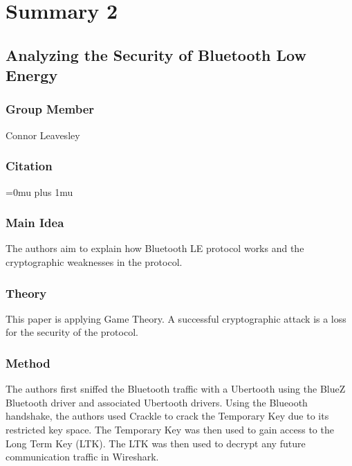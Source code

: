 \section{Summary 2}

\noindent
\subsection{{A}nalyzing the {S}ecurity of {B}luetooth {L}ow {E}nergy}

\subsubsection{Group Member}

\noindent
Connor Leavesley

\noindent
\subsubsection{Citation}

\Urlmuskip=0mu plus 1mu\relax



\subsubsection{Main Idea}

\noindent
The authors aim to explain how Bluetooth LE protocol works and the cryptographic weaknesses in the protocol.


\subsubsection{Theory}

\noindent
This paper is applying Game Theory. A successful cryptographic attack is a loss for the security of the protocol. 

\subsubsection{Method}

\noindent
The authors first sniffed the Bluetooth traffic with a Ubertooth using the BlueZ Bluetooth driver and associated Ubertooth drivers. Using the Blueooth handshake, the authors used Crackle to crack the Temporary Key due to its restricted key space. The Temporary Key was then used to gain access to the Long Term Key (LTK). The LTK was then used to decrypt any future communication traffic in Wireshark. 

